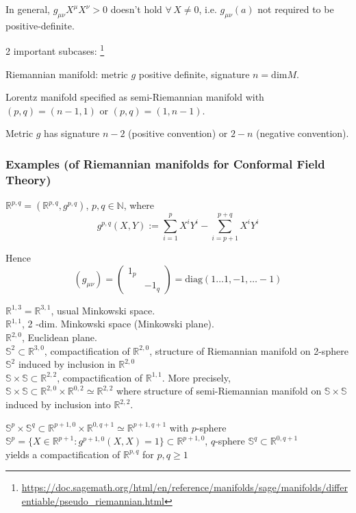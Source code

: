 In general, $g_{\mu \nu}X^{\mu} X^{\nu} >0 $ doesn't hold $\forall \, X \neq 0$, i.e. $g_{\mu \nu}(a)$ not required to be positive-definite.

2 important subcases: \footnote{\url{https://doc.sagemath.org/html/en/reference/manifolds/sage/manifolds/differentiable/pseudo_riemannian.html}}

Riemannian manifold: metric $g$ positive definite, signature $n= \text{dim}M$. 

Lorentz manifold specified as semi-Riemannian manifold with $(p,q)= (n-1,1)$ or $(p,q) = (1, n-1)$. 

Metric $g$ has signature $n-2$ (positive convention) or $2-n$ (negative convention).

\subsubsection{Examples (of Riemannian manifolds for Conformal Field Theory)}

$\mathbb{R}^{p,q} = (\mathbb{R}^{p,q}, g^{p,q})$, $p,q \in \mathbb{N}$, where
\[
g^{p,q}(X,Y) := \sum_{i=1}^p X^i Y^i - \sum_{i = p+1}^{p+q} X^i Y^i
\]

Hence
\[
(g_{\mu \nu}) = \left( \begin{matrix} 1_p & \\ & -1_q \end{matrix} \right) = \text{diag}(1\dots 1, -1, \dots  -1)
\]

$\mathbb{R}^{1,3} = \mathbb{R}^{3,1}$, usual Minkowski space. \\
$\mathbb{R}^{1,1}$, 2 -dim. Minkowski space (Minkowski plane). \\
$\mathbb{R}^{2,0}$, Euclidean plane. \\
$\mathbb{S}^2 \subset \mathbb{R}^{3,0}$, compactification of $\mathbb{R}^{2,0}$, structure of Riemannian manifold on 2-sphere $\mathbb{S}^2$ induced by inclusion in $\mathbb{R}^{2,0}$ \\
$\mathbb{S} \times \mathbb{S} \subset \mathbb{R}^{2,2}$, compactification of $\mathbb{R}^{1,1}$. More precisely, \\
$\mathbb{S} \times \mathbb{S} \subset \mathbb{R}^{2,0} \times \mathbb{R}^{0,2} \simeq \mathbb{R}^{2,2}$ where structure of semi-Riemannian manifold on $\mathbb{S} \times \mathbb{S}$ induced by inclusion into $\mathbb{R}^{2,2}$. 

$\mathbb{S}^p \times \mathbb{S}^q \subset \mathbb{R}^{p+1, 0} \times \mathbb{R}^{0, q+1} \simeq \mathbb{R}^{p+1,q+1}$ with $p$-sphere $\mathbb{S}^p = \lbrace X \in \mathbb{R}^{p+1} : g^{p+1, 0}(X,X) = 1\rbrace \subset \mathbb{R}^{p+1,0}$, $q$-sphere $\mathbb{S}^q \subset \mathbb{R}^{0, q+1}$ \\
yields a compactification of $\mathbb{R}^{p,q}$ for $p,q \geq 1$

